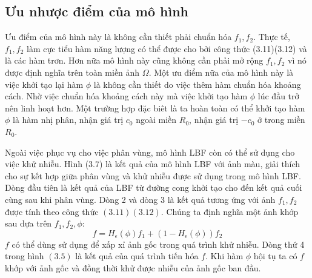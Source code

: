 \documentclass[12pt, oneside, a4]{book}
\begin{document}
\subsection{Ưu nhược điểm của mô hình}
Ưu điểm của mô hình này là không cần thiết phải chuẩn hóa $f_1, f_2$. Thực tế, $f_1, f_2$ làm cực tiểu hàm năng lượng có thể được cho bởi công thức (3.11)(3.12) và là các hàm trơn. Hơn nữa mô hình này cũng không cần phải mở rộng $f_1, f_2$ vì nó được định nghĩa trên toàn miền ảnh $\Omega$. Một ưu điểm nữa của mô hình này là việc khởi tạo lại hàm $\phi$ là không cần thiết do việc thêm hàm chuẩn hóa khoảng cách. Nhờ việc chuẩn hóa khoảng cách này mà việc khởi tạo hàm $\phi$ lúc đầu trở nên linh hoạt hơn. Một trường hợp đặc biêt là ta hoàn toàn có thể khởi tạo hàm $\phi$ là hàm nhị phân, nhận giá trị $c_0$ ngoài miền $R_0$, nhận giá trị $-c_0$ ở trong miền $R_0$.

Ngoài việc phục vụ cho việc phân vùng, mô hình LBF còn có thể sử dụng cho việc khử nhiễu. Hình (3.7) là kết quả của mô hình LBF với ảnh màu, giải thích cho sự kết hợp giữa phân vùng và khử nhiễu được sử dụng trong mô hình LBF. Dòng đầu tiên là kết quả của LBF từ đường cong khởi tạo cho đến kết quả cuối cùng sau khi phân vùng. Dòng 2 và dòng 3 là kết quả tương ứng với ảnh $f_1, f_2$ được tính theo công thức $(3.11)(3.12)$. Chúng ta định nghĩa một ảnh khớp sau dựa trên $f_1, f_2, \phi$:
\begin{equation*}
f=H_{\epsilon}(\phi)f_1+(1-H_{\epsilon}(\phi))f_2
\end{equation*}
$f$ có thể dùng sử dụng để xấp xỉ ảnh gốc trong quá trình khử nhiễu. Dòng thứ 4 trong hình $(3.5)$ là kết quả của quá trình tiến hóa $f$. Khi hàm $\phi$ hội tụ ta có $f$ khớp với ảnh gốc và đồng thời khử được nhiễu của ảnh gốc ban đầu. 
\end{document}
